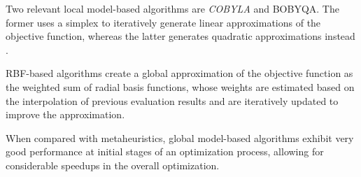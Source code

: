 Two relevant local model-based algorithms are \textit{\ac{COBYLA}} and \ac{BOBYQA}. The former uses a simplex to iteratively generate linear approximations of the objective function, whereas the latter generates quadratic approximations instead \cite{Powell1994COBYLA, Powell2009BOBYQA}.

\ac{RBF}-based algorithms create a global approximation of the objective function as the weighted sum of radial basis functions, whose weights are estimated based on the interpolation of previous evaluation results and are iteratively updated to improve the approximation.

When compared with metaheuristics, global model-based algorithms exhibit very good performance at initial stages of an optimization process, allowing for considerable speedups in the overall optimization.
